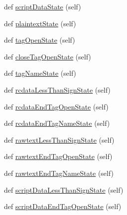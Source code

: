 \begin{DoxyCompactItemize}
\item 
def \hyperlink{classpip_1_1__vendor_1_1html5lib_1_1__tokenizer_1_1HTMLTokenizer_aa1bab871ba6b1561d74cb7b2d7028b49}{script\+Data\+State} (self)
\item 
def \hyperlink{classpip_1_1__vendor_1_1html5lib_1_1__tokenizer_1_1HTMLTokenizer_a52671c9ff4c678616f1e689af162365b}{plaintext\+State} (self)
\item 
def \hyperlink{classpip_1_1__vendor_1_1html5lib_1_1__tokenizer_1_1HTMLTokenizer_add701dff4d1ada0a52ae333d50a72d84}{tag\+Open\+State} (self)
\item 
def \hyperlink{classpip_1_1__vendor_1_1html5lib_1_1__tokenizer_1_1HTMLTokenizer_aab95d2ca82202a18b159a08b84637c19}{close\+Tag\+Open\+State} (self)
\item 
def \hyperlink{classpip_1_1__vendor_1_1html5lib_1_1__tokenizer_1_1HTMLTokenizer_a12051100f2d4f1045b834a4b303e8f8b}{tag\+Name\+State} (self)
\item 
def \hyperlink{classpip_1_1__vendor_1_1html5lib_1_1__tokenizer_1_1HTMLTokenizer_a231758ec02b5f15e8d58f38ca355d97e}{rcdata\+Less\+Than\+Sign\+State} (self)
\item 
def \hyperlink{classpip_1_1__vendor_1_1html5lib_1_1__tokenizer_1_1HTMLTokenizer_a5d5c6b10b714d578f1df405a3fb45b51}{rcdata\+End\+Tag\+Open\+State} (self)
\item 
def \hyperlink{classpip_1_1__vendor_1_1html5lib_1_1__tokenizer_1_1HTMLTokenizer_ab5926d805a5e77dca0e497be3282f521}{rcdata\+End\+Tag\+Name\+State} (self)
\item 
def \hyperlink{classpip_1_1__vendor_1_1html5lib_1_1__tokenizer_1_1HTMLTokenizer_a0212c1f85a437899f2f74d105c406cba}{rawtext\+Less\+Than\+Sign\+State} (self)
\item 
def \hyperlink{classpip_1_1__vendor_1_1html5lib_1_1__tokenizer_1_1HTMLTokenizer_af9ebc3327e1568b7a85ddd2ad01e696b}{rawtext\+End\+Tag\+Open\+State} (self)
\item 
def \hyperlink{classpip_1_1__vendor_1_1html5lib_1_1__tokenizer_1_1HTMLTokenizer_aa68056f6b638d3e064aacfe9bf154835}{rawtext\+End\+Tag\+Name\+State} (self)
\item 
def \hyperlink{classpip_1_1__vendor_1_1html5lib_1_1__tokenizer_1_1HTMLTokenizer_a7cee7978efebf1fbdae8d6750c799aba}{script\+Data\+Less\+Than\+Sign\+State} (self)
\item 
def \hyperlink{classpip_1_1__vendor_1_1html5lib_1_1__tokenizer_1_1HTMLTokenizer_ab5b6e73986004debe7890f3f3f504009}{script\+Data\+End\+Tag\+Open\+State} (self)
\item 

\end{DoxyCompactItemize}
